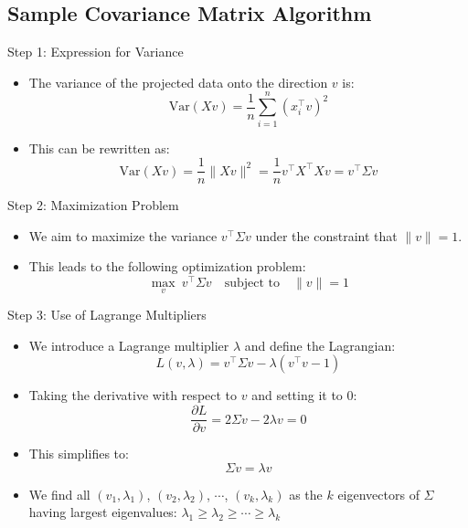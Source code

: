 \documentclass[serif, aspectratio=169]{beamer}
\begin{document}
\subsection{Sample Covariance Matrix Algorithm}

\begin{frame}{Step 1: Expression for Variance}
    \begin{itemize}
        \item The variance of the projected data onto the direction \( v \) is:
        \[
        \text{Var}(Xv) = \frac{1}{n} \sum_{i=1}^{n} (x_i^\top v)^2
        \]
        \item This can be rewritten as:
        \[
        \text{Var}(Xv) = \frac{1}{n} \|Xv\|^2 = \frac{1}{n} v^\top X^\top X v = v^\top \Sigma v
        \]
    \end{itemize}
\end{frame}

\begin{frame}{Step 2: Maximization Problem}
    \begin{itemize}
        \item We aim to maximize the variance \( v^\top \Sigma v \) under the constraint that \( \|v\| = 1 \).
        \item This leads to the following optimization problem:
        \[
        \max_{v} \ v^\top \Sigma v \quad \text{subject to} \quad \|v\| = 1
        \]
    \end{itemize}
\end{frame}

\begin{frame}{Step 3: Use of Lagrange Multipliers}
    \begin{itemize}
        \item We introduce a Lagrange multiplier \( \lambda \) and define the Lagrangian:
        \[
        L(v, \lambda) = v^\top \Sigma v - \lambda (v^\top v - 1)
        \]
        \item Taking the derivative with respect to \( v \) and setting it to 0:
        \[
        \frac{\partial L}{\partial v} = 2 \Sigma v - 2 \lambda v = 0
        \]
        \item This simplifies to:
        \[
        \Sigma v = \lambda v
        \]
        \item We find all $(v_1, \lambda_1)$, $(v_2, \lambda_2)$, $\cdots$, $(v_k, \lambda_k)$ as the $k$ eigenvectors of $\Sigma$ having largest eigenvalues: $\lambda_1 \geq \lambda_2 \geq \cdots \geq \lambda_k$ 
    \end{itemize}
\end{frame}
\end{document}
